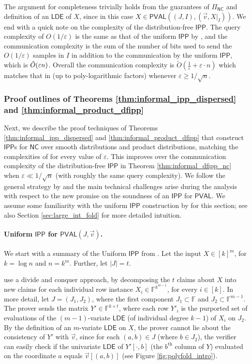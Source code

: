 \documentclass[11pt]{article}
\newcommand{\NC}{\mathsf{NC}}
\newcommand{\PVAL}{\mathsf{PVAL}}
\newcommand{\IPP}{\mathsf{IPP}}
\newcommand{\LDE}{\mathsf{LDE}}
\newcommand{\F}{\mathbb{F}}
\newcommand{\eps}{\varepsilon}
\begin{document}
The argument for completeness trivially holds from the guarantees of $\Pi_\NC$ and definition of an $\LDE$ of $X$, since in this case $X \in \PVAL((J,I),(\Vec{v},X \vert_I))$. We end with a quick note on the complexity of the distribution-free $\IPP$. The query complexity of $O(1/\varepsilon)$ is the same as that of the uniform $\IPP$ by \cite{RR20_batch_polylog}, and the communication complexity is the sum of the number of bits used to send the $O(1/\varepsilon)$ samples in $I$ in addition to the communication by the uniform $\IPP$, which is $\Tilde{O}(\varepsilon n)$. Overall the communication complexity is $\tilde{O}\left(\frac{1}{\varepsilon}+\varepsilon\cdot n\right)$ which matches that in \cite{RR20_batch_polylog} (up to poly-logarithmic factors) whenever $\eps \geq 1/\sqrt{n}$. 

\subsubsection{Proof outlines of Theorems \ref{thm:informal_ipp_dispersed} and \ref{thm:informal_product_dfipp}}
\label{sec:technique_special_dist}
Next, we describe the proof techniques of Theorems \ref{thm:informal_ipp_dispersed} and \ref{thm:informal_product_dfipp} that construct $\IPP$s for $\NC$ over smooth distributions and product distributions, matching the complexities of \cite{RVW} for every value of $\varepsilon$. This improves over the communication complexity of the distribution-free $\IPP$ in Theorem \ref{thm:informal_dfipp_nc} when $\varepsilon \ll 1/\sqrt{n}$ (with roughly the same query complexity). We follow the general strategy by \cite{RVW} and the main technical challenges arise during the analysis with respect to the new promise on the soundness of an $\IPP$ for $\PVAL$. We assume some familiarity with the uniform $\IPP$ construction by \cite{RVW} for this section; see also Section \ref{sec:large_int_fold} for more detailed intuition.

\paragraph*{Uniform $\IPP$ for $\PVAL(J,\Vec{v})$.} We start with a summary of the Uniform $\IPP$ from \cite{RVW}. Let the input $X \in [k]^m$, for $k = \log n$ and $n = k^m$. Further, let $\vert J \vert = t$. 

\cite{RVW} use a divide and conquer approach, by decomposing the $t$ claims about $X$ into new claims for each individual row instance $X_i \in \F^{k^{m-1}}$, for every $i\in [k]$. In more detail, let $J = (J_1,J_2)$, where the first component $J_1 \subset \F$ and $J_2 \subset \F^{m-1}$. The prover sends the matrix $Y' \in \F^{k\times t}$, where each row $Y'_i$ is the purported set of evaluations of the $(m-1)$-variate $\LDE$ (of individual degree $k-1$) of $X_i$ on $J_2$. By the definition of an $m$-variate $\LDE$ on $X$, the prover cannot lie about the consistency of $Y'$ with $\Vec{v}$, since for each $(a,b) \in J$ (where $b \in J_2$), the verifier can easily check if the univariate $\LDE$ of $Y'[\cdot,b]$ (the $b^{\text{th}}$ column of $Y$) evaluated on the coordinate $a$ equals $\Vec{v}[(a,b)]$ (see Figure \ref{fig:polyfold_intro}).
\end{document}
